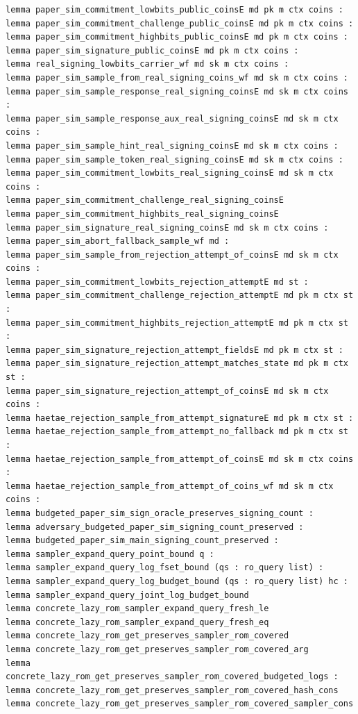 \begin{lstlisting}[language=EasyCrypt,basicstyle=\ttfamily\tiny]
lemma paper_sim_commitment_lowbits_public_coinsE md pk m ctx coins :
lemma paper_sim_commitment_challenge_public_coinsE md pk m ctx coins :
lemma paper_sim_commitment_highbits_public_coinsE md pk m ctx coins :
lemma paper_sim_signature_public_coinsE md pk m ctx coins :
lemma real_signing_lowbits_carrier_wf md sk m ctx coins :
lemma paper_sim_sample_from_real_signing_coins_wf md sk m ctx coins :
lemma paper_sim_sample_response_real_signing_coinsE md sk m ctx coins :
lemma paper_sim_sample_response_aux_real_signing_coinsE md sk m ctx coins :
lemma paper_sim_sample_hint_real_signing_coinsE md sk m ctx coins :
lemma paper_sim_sample_token_real_signing_coinsE md sk m ctx coins :
lemma paper_sim_commitment_lowbits_real_signing_coinsE md sk m ctx coins :
lemma paper_sim_commitment_challenge_real_signing_coinsE
lemma paper_sim_commitment_highbits_real_signing_coinsE
lemma paper_sim_signature_real_signing_coinsE md sk m ctx coins :
lemma paper_sim_abort_fallback_sample_wf md :
lemma paper_sim_sample_from_rejection_attempt_of_coinsE md sk m ctx coins :
lemma paper_sim_commitment_lowbits_rejection_attemptE md st :
lemma paper_sim_commitment_challenge_rejection_attemptE md pk m ctx st :
lemma paper_sim_commitment_highbits_rejection_attemptE md pk m ctx st :
lemma paper_sim_signature_rejection_attempt_fieldsE md pk m ctx st :
lemma paper_sim_signature_rejection_attempt_matches_state md pk m ctx st :
lemma paper_sim_signature_rejection_attempt_of_coinsE md sk m ctx coins :
lemma haetae_rejection_sample_from_attempt_signatureE md pk m ctx st :
lemma haetae_rejection_sample_from_attempt_no_fallback md pk m ctx st :
lemma haetae_rejection_sample_from_attempt_of_coinsE md sk m ctx coins :
lemma haetae_rejection_sample_from_attempt_of_coins_wf md sk m ctx coins :
lemma budgeted_paper_sim_sign_oracle_preserves_signing_count :
lemma adversary_budgeted_paper_sim_signing_count_preserved :
lemma budgeted_paper_sim_main_signing_count_preserved :
lemma sampler_expand_query_point_bound q :
lemma sampler_expand_query_log_fset_bound (qs : ro_query list) :
lemma sampler_expand_query_log_budget_bound (qs : ro_query list) hc :
lemma sampler_expand_query_joint_log_budget_bound
lemma concrete_lazy_rom_sampler_expand_query_fresh_le
lemma concrete_lazy_rom_sampler_expand_query_fresh_eq
lemma concrete_lazy_rom_get_preserves_sampler_rom_covered
lemma concrete_lazy_rom_get_preserves_sampler_rom_covered_arg
lemma concrete_lazy_rom_get_preserves_sampler_rom_covered_budgeted_logs :
lemma concrete_lazy_rom_get_preserves_sampler_rom_covered_hash_cons
lemma concrete_lazy_rom_get_preserves_sampler_rom_covered_sampler_cons

\end{lstlisting}
